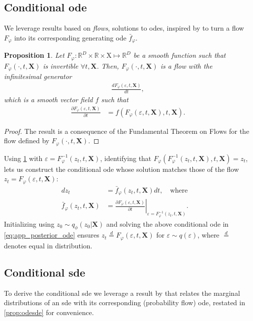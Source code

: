 \documentclass{article}
\def\R{\mathbb{R}}
\def\X{\mathbf{X}}
\def\setX{\mathrm{X}}
\def\e{\varepsilon}
\def\ph{\varphi}
\def\barf{\bar{f}}
\def\p{\partial}
\theoremstyle{plain}
\newtheorem{proposition}[theorem]{Proposition}
\theoremstyle{definition}
\theoremstyle{remark}
\begin{document}
\subsection{Conditional \gls{ode}}
\label{app:posteriorode}
We leverage results based on \emph{flows}, solutions to \glspl{ode}, inspired by \citet{bilovs2021neural,lee2012introduction,bartosh2024neural} to turn a flow $F_\ph$ into its corresponding generating \gls{ode} $\barf_\ph$. 
\begin{proposition}
    Let $F_\ph: \R^D \times \R \times \setX \mapsto \R^D$ be a smooth function such that $F_\ph(\cdot, t, \X)$ is invertible $\forall t, \X$. Then, $F_\ph(\cdot, t, \X)$ is a \emph{flow} with the infinitesimal generator
    \begin{align}
        \frac{d F_\ph(\e, t, \X)}{dt},
    \end{align}
    which is a smooth vector field $f$ such that
    \begin{align}
         \frac{\p F_\ph(\e, t, \X)}{\p t} &= f(F_\ph(\e, t, \X),t,\X).
    \end{align}
    \label{prop:flowode}
\end{proposition}
\begin{proof}
    The result is a consequence of the Fundamental Theorem on Flows \citep[Theorem 9.12]{lee2012introduction} for the flow defined by $F_\ph(\cdot, t, \X)$.
\end{proof}
Using \cref{prop:flowode} with $\e = F_\ph^{-1}(z_t, t, \X)$, identifying that $F_\ph(F_\ph^{-1}(z_t, t, \X),t,\X) = z_t$, lets us construct the conditional \gls{ode} whose solution matches those of the flow $z_t = F_\ph(\e, t, \X)$:
\begin{align}
    d z_t & = \barf_\ph(z_t, t, \X) d t, 
    \quad \textrm{where} \quad \label{eq:app_posterior_ode} \\
    \barf_\ph(z_t, t, \X) & = \left. \frac{\p F_\ph(\e, t, \X)}{\p t} \right|_{\e=F_\ph^{-1}(z_t, t, \X)}.
\end{align}
Initializing using $z_0 \sim q_\phi(z_0|\X)$ and solving the above conditional \gls{ode} in \cref{eq:app_posterior_ode} ensures $z_t \overset{d}{=} F_\ph(\e, t, \X)$ for $\e \sim q(\e)$, where $\overset{d}{=}$ denotes equal in distribution.


\subsection{Conditional \gls{sde}}
\label{app:posteriorsde}
To derive the conditional \gls{sde} we leverage a result by \citet{song2021scorebased} that relates the marginal distributions of an \gls{sde} with its corresponding (probability flow) \gls{ode}, restated in \cref{prop:odesde} for convenience.
\end{document}
